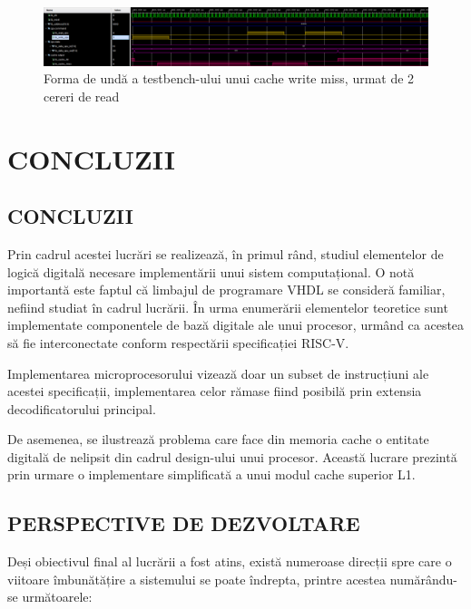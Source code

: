 \documentclass[12pt]{article}
\begin{document}
 \begin{figure}[h!]
 \hspace*{-0.5cm}\includegraphics[scale = 0.34]{cachehitmiss.png}
 \centering
 \caption{Forma de undă a testbench-ului unui cache write miss, urmat de 2 cereri de read}
 \label{Figura:74}
 \end{figure}
 
\newpage 
\section{\centering CONCLUZII} 
\subsection{CONCLUZII}
Prin cadrul acestei lucrări se realizează, în primul rând, studiul elementelor de logică digitală necesare implementării unui sistem computațional. O notă importantă este faptul că limbajul de programare VHDL se consideră familiar, nefiind studiat în cadrul lucrării. În urma enumerării elementelor teoretice sunt implementate componentele de bază digitale ale unui procesor, urmând ca acestea să fie interconectate conform respectării specificației RISC-V.

Implementarea microprocesorului vizează doar un subset de instrucțiuni ale acestei specificații, implementarea celor rămase fiind posibilă prin extensia decodificatorului principal. 

De asemenea, se ilustrează problema care face din memoria cache o entitate digitală de nelipsit din cadrul design-ului unui procesor. Această lucrare prezintă prin urmare o implementare simplificată a unui modul cache superior L1.

\subsection{PERSPECTIVE DE DEZVOLTARE}
Deși obiectivul final al lucrării a fost atins, există numeroase direcții spre care o viitoare îmbunătățire a sistemului se poate îndrepta, printre acestea numărându-se următoarele:
\end{document}
